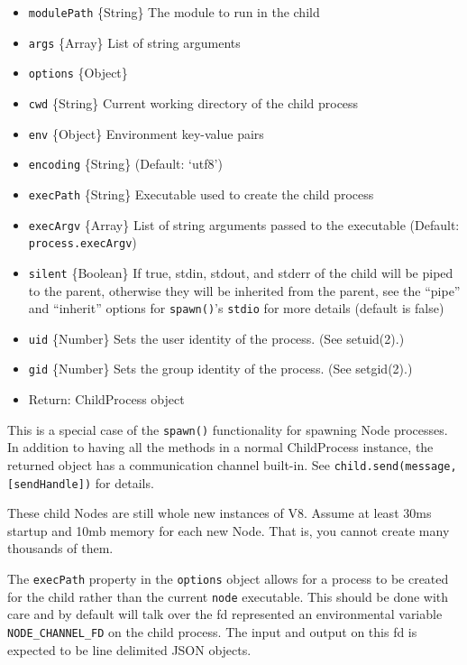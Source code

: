 \begin{itemize}
\itemsep1pt\parskip0pt
\item
  \texttt{modulePath} \{String\} The module to run in the child
\item
  \texttt{args} \{Array\} List of string arguments
\item
  \texttt{options} \{Object\}
\item
  \texttt{cwd} \{String\} Current working directory of the child process
\item
  \texttt{env} \{Object\} Environment key-value pairs
\item
  \texttt{encoding} \{String\} (Default: `utf8')
\item
  \texttt{execPath} \{String\} Executable used to create the child
  process
\item
  \texttt{execArgv} \{Array\} List of string arguments passed to the
  executable (Default: \texttt{process.execArgv})
\item
  \texttt{silent} \{Boolean\} If true, stdin, stdout, and stderr of the
  child will be piped to the parent, otherwise they will be inherited
  from the parent, see the ``pipe'' and ``inherit'' options for
  \texttt{spawn()}'s \texttt{stdio} for more details (default is false)
\item
  \texttt{uid} \{Number\} Sets the user identity of the process. (See
  setuid(2).)
\item
  \texttt{gid} \{Number\} Sets the group identity of the process. (See
  setgid(2).)
\item
  Return: ChildProcess object
\end{itemize}

This is a special case of the \texttt{spawn()} functionality for
spawning Node processes. In addition to having all the methods in a
normal ChildProcess instance, the returned object has a communication
channel built-in. See \texttt{child.send(message, {[}sendHandle{]})} for
details.

These child Nodes are still whole new instances of V8. Assume at least
30ms startup and 10mb memory for each new Node. That is, you cannot
create many thousands of them.

The \texttt{execPath} property in the \texttt{options} object allows for
a process to be created for the child rather than the current
\texttt{node} executable. This should be done with care and by default
will talk over the fd represented an environmental variable
\texttt{NODE\_CHANNEL\_FD} on the child process. The input and output on
this fd is expected to be line delimited JSON objects.


